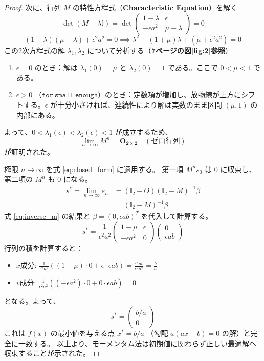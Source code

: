 \documentclass[dvipdfmx,a4paper,11pt]{jsarticle}
\begin{document}
\begin{proof}
\noindent
次に、行列 $M$ の特性方程式（\textbf{Characteristic Equation}）を解く
\[
\det(M - \lambda \mathbb{I}) = \det \begin{pmatrix} 1-\lambda & \epsilon \\ -\epsilon a^2 & \mu-\lambda \end{pmatrix} = 0
\]
\[
(1-\lambda)(\mu-\lambda) + \epsilon^2 a^2 = 0 \implies \lambda^2 - (1+\mu)\lambda + (\mu + \epsilon^2 a^2) = 0
\]
この2次方程式の解 $\lambda_1, \lambda_2$ について分析する（\textbf{7ページの図\ref{fig:2}参照}）
\begin{enumerate}
    \item $\epsilon = 0$ のとき：解は $\lambda_1(0)=\mu$ と $\lambda_2(0)=1$ である。ここで $0 < \mu < 1$ である。
    \item $\epsilon > 0$ （$\mathtt{for\ small\ enough}$）のとき：定数項が増加し、放物線が上方にシフトする。$\epsilon$ が十分小さければ、連続性により解は実数のまま区間 $(\mu, 1)$ の内部にある。
\end{enumerate}
よって、$0 < \lambda_1(\epsilon) < \lambda_2(\epsilon) < 1$ が成立するため、
\[ \lim_{n \to \infty} M^n = \mathbf{O_{2 \times 2}} \quad (\text{ゼロ行列}) \]
が証明された。

\noindent
極限 $n \to \infty$ を式 \eqref{eq:closed_form} に適用する。
第一項 $M^n s_0$ は 0 に収束し、第二項の $M^n$ も 0 になる。
\begin{align*}
    s^* = \lim_{n \to \infty} s_n &= (\mathbb{I}_2 - O)(\mathbb{I}_2 - M)^{-1} \beta \\
    &= (\mathbb{I}_2 - M)^{-1} \beta
\end{align*}
式 \eqref{eq:inverse_m} の結果と $\beta = (0, \epsilon ab)^T$ を代入して計算する。
\[
s^* = \frac{1}{\epsilon^2 a^2} \begin{pmatrix} 1-\mu & \epsilon \\ -\epsilon a^2 & 0 \end{pmatrix} \begin{pmatrix} 0 \\ \epsilon ab \end{pmatrix}
\]
行列の積を計算すると：
\begin{itemize}
    \item $x$成分: $\frac{1}{\epsilon^2 a^2} \left( (1-\mu)\cdot 0 + \epsilon \cdot \epsilon ab \right) = \frac{\epsilon^2 ab}{\epsilon^2 a^2} = \frac{b}{a}$
    \item $v$成分: $\frac{1}{\epsilon^2 a^2} \left( (-\epsilon a^2)\cdot 0 + 0 \cdot \epsilon ab \right) = 0$
\end{itemize}
となる。よって、
\[
s^* = \begin{pmatrix} b/a \\ 0 \end{pmatrix}
\]
これは $f(x)$ の最小値を与える点 $x^* = b/a$ （勾配 $a(ax - b)=0$ の解）と完全に一致する。
以上より、モーメンタム法は初期値に関わらず正しい最適解へ収束することが示された。


\end{proof}
\end{document}
